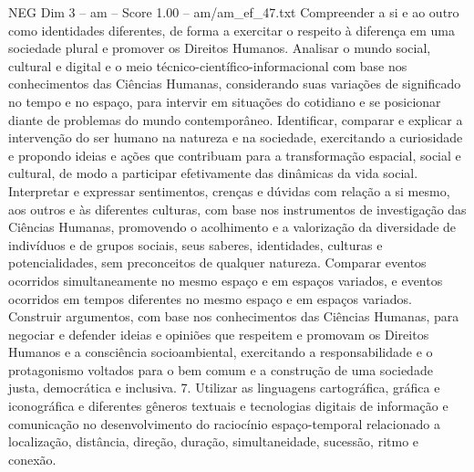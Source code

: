 \begin{textsample}{NEG Dim 3 – am – Score 1.00 – am/am\_ef\_47.txt}  \label{ex:f3_neg_260}
Compreender a si e ao outro como identidades diferentes, de forma a exercitar o respeito à diferença em uma sociedade plural e promover os Direitos Humanos.
Analisar o mundo social, cultural e digital e o meio técnico-científico-informacional com base nos conhecimentos das Ciências Humanas, considerando suas variações de significado no tempo e no espaço, para intervir em situações do cotidiano e se posicionar diante de problemas do mundo contemporâneo.
Identificar, comparar e explicar a intervenção do ser humano na natureza e na sociedade, exercitando a curiosidade e propondo ideias e ações que contribuam para a transformação espacial, social e cultural, de modo a participar efetivamente das dinâmicas da vida social.
Interpretar e expressar sentimentos, crenças e dúvidas com relação a si mesmo, aos outros e às diferentes culturas, com base nos instrumentos de investigação das Ciências Humanas, promovendo o acolhimento e a valorização da diversidade de indivíduos e de grupos sociais, seus saberes, identidades, culturas e potencialidades, sem preconceitos de qualquer natureza.
Comparar eventos ocorridos simultaneamente no mesmo espaço e em espaços variados, e eventos ocorridos em tempos diferentes no mesmo espaço e em espaços variados.
Construir argumentos, com base nos conhecimentos das Ciências Humanas, para negociar e defender ideias e opiniões que respeitem e promovam os Direitos Humanos e a consciência socioambiental, exercitando a responsabilidade e o protagonismo voltados para o bem comum e a construção de uma sociedade justa, democrática e inclusiva. 7.
Utilizar as linguagens cartográfica, gráfica e iconográfica e diferentes gêneros textuais e tecnologias digitais de informação e comunicação no desenvolvimento do raciocínio espaço-temporal relacionado a localização, distância, direção, duração, simultaneidade, sucessão, ritmo e conexão.

\end{textsample}
